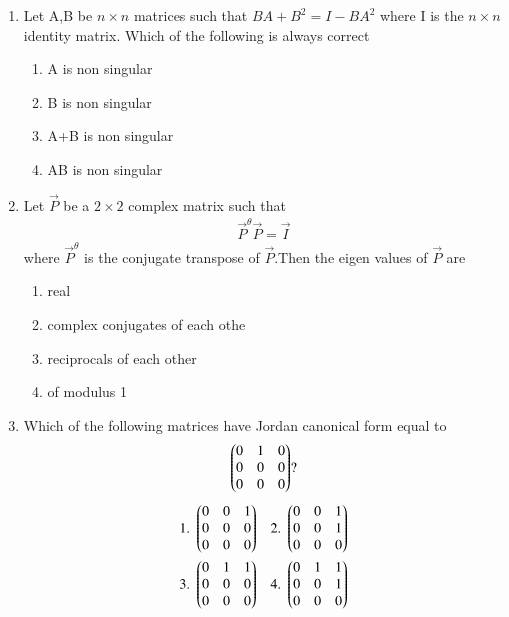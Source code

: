 \renewcommand{\theequation}{\theenumi}
\renewcommand{\thefigure}{\theenumi}
\begin{enumerate}[label=\thesection.\arabic*.,ref=\thesection.\theenumi]

\item Let A,B be $n \times n$ matrices such that $BA+ B^2= I-BA^2$ where I is the $n\times n$ identity matrix. Which of the following is always correct
\begin{enumerate}
    \item A is non singular
    \item B is non singular
    \item A+B is non singular
    \item AB is non singular
\end{enumerate}
%
%
\solution

\item Let $\vec{P}$ be a $2\times 2$ complex matrix such that
\begin{align}
\vec{P}^\theta \vec{P} =\vec{I}
\end{align}
where $\vec{P}^\theta$ is the conjugate transpose of $\vec{P}$.Then the eigen values of $\vec{P}$ are
\begin{enumerate}
\item{real}
\item{complex conjugates of each othe}
\item{reciprocals of each other}
\item{of modulus 1}
\end{enumerate}
%
%
\solution

\item Which of the following matrices have Jordan canonical form equal to
\begin{align*}
        \begin{pmatrix}0&1&0\\0&0&0\\0&0&0\end{pmatrix}?
\end{align*}
\begin{align*}
    \mbox{1. }\myvec{0&0&1\\0&0&0\\0&0&0}&&\mbox{2. }\myvec{0&0&1\\0&0&1\\0&0&0}\\
    \mbox{3. }\myvec{0&1&1\\0&0&0\\0&0&0}&&\mbox{4. }\myvec{0&1&1\\0&0&1\\0&0&0}

\end{align*}
\end{enumerate}
